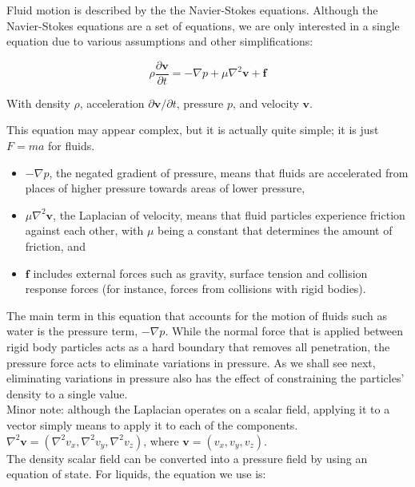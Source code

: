 \documentclass[]{article}
\begin{document}
	Fluid motion is described by the the Navier-Stokes equations. Although the Navier-Stokes equations are a set of
	equations, we are only interested in a single equation due to various assumptions and other simplifications:
	
	\begin{equation}
		\rho \frac{\partial \mathbf{v}}{\partial t} = - \nabla p + \mu \nabla ^2 \mathbf{v} + \mathbf{f}
	\end{equation}

	With density \( \rho \), acceleration \( \partial \mathbf{v} / \partial t \), pressure \( p \), and velocity 
	\( \mathbf{v} \).
	
	This equation may appear complex, but it is actually quite simple; it is just \(F = ma\) for fluids.
	\begin{itemize}
		\item \(- \nabla p\), the negated gradient of pressure, means that fluids are accelerated from 
		places of higher pressure towards areas of lower pressure,
		\item \(\mu \nabla ^2 \mathbf{v}\), the Laplacian of velocity, means that fluid particles experience friction 
		against each other, with \(\mu\) being a constant that determines the amount of friction, and
		\item \(\mathbf{f}\) includes external forces such as gravity, surface tension and collision response forces
		 (for instance, forces from collisions with rigid bodies).
	\end{itemize}
	
	The main term in this equation that accounts for the motion of fluids such as water is the pressure term, 
	\(- \nabla p\). While the normal force that is applied between rigid body particles acts as a hard boundary that
	removes all penetration, the pressure force acts to eliminate variations in pressure. As we shall see next, 
	eliminating variations in pressure also has the effect of constraining the particles' density to a single value.\\
	
	Minor note: although the Laplacian operates on a scalar field, applying it to a vector simply means to apply it to
	each of the components. \(\nabla ^2 \mathbf{v} = (\nabla ^2 v_x, \nabla ^2 v_y, \nabla ^2 v_z) \), where
	\(\mathbf{v} = (v_x, v_y, v_z)\).\\
	
	The density scalar field can be converted into a pressure field by using an equation of state. For liquids, the
	equation we use is:
	
\end{document}
